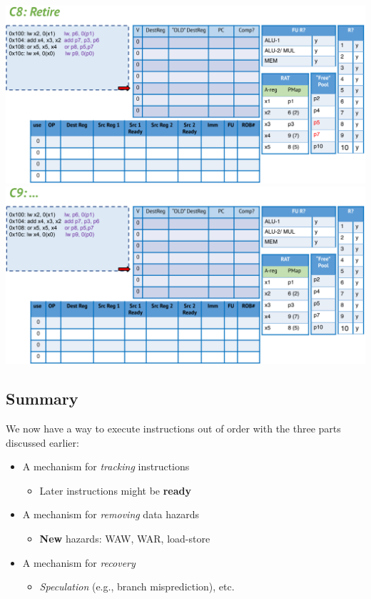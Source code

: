 \documentclass[10pt]{article}
\begin{document}
\begin{center}
\includegraphics*[width=\textwidth]{W5_out_of_order/20.png}\\
\includegraphics*[width=\textwidth]{W5_out_of_order/21.png}
\end{center}
\subsection*{Summary}
We now have a way to execute instructions out of order with the three parts discussed earlier:
\begin{itemize}
    \item A mechanism for \textit{tracking} instructions
    \begin{itemize}
        \item Later instructions might be \textbf{ready}
    \end{itemize}
    \item A mechanism for \textit{removing} data hazards
    \begin{itemize}
        \item \textbf{New} hazards: WAW, WAR, load-store
    \end{itemize}
    \item A mechanism for \textit{recovery}
    \begin{itemize}
        \item \textit{Speculation} (e.g., branch misprediction), etc.
    \end{itemize}
\end{itemize}
\end{document}
